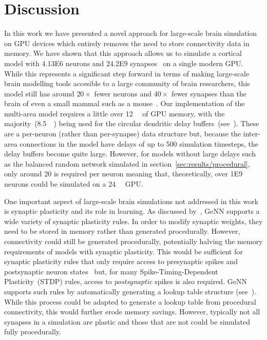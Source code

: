 \documentclass[9pt,a4paper]{amsart}
\begin{document}
\section{Discussion}
In this work we have presented a novel approach for large-scale brain simulation on GPU devices which entirely removes the need to store connectivity data in memory.
We have shown that this approach allows us to simulate a cortical model with \num{4.13E6} neurons and \num{24.2E9} synapses~\citep{Schmidt2018a,Schmidt2018} on a single modern GPU.
While this represents a significant step forward in terms of making large-scale brain modelling tools accesible to a large community of brain researchers, this model still has around $20\times$ fewer neurons and $40\times$ fewer synapses than the brain of even a small mammal such as a mouse~\citep{Herculano-Houzel2010}.
Our implementation of the multi-area model requires a little over \SI{12}{\giga\byte} of GPU memory, with the majority~(\SI{8.5}{\giga\byte}) being used for the circular dendritic delay buffers~(see~\citet{Knight2018}).
These are a per-neuron (rather than per-synapse) data structure but, because the inter-area connections in the model have delays of up to 500 simulation timesteps, the delay buffers become quite large.
However, for models without large delays such as the balanced random network simulated in section~\ref{sec:results/procedural}, only around \SI{20}{\byte} is required per neuron meaning that, theoretically, over \num{1E9} neurons could be simulated on a \SI{24}{\giga\byte} GPU.

One important aspect of large-scale brain simulations not addressed in this work is synaptic plasticity and its role in learning.
As discussed by~\citet{Knight2018}, GeNN supports a wide variety of synaptic plasticity rules.
In order to modify synaptic weights, they need to be stored in memory rather than generated procedurally.
However, connectivity could still be generated procedurally, potentially halving the memory requirements of models with synaptic plasticity.
This would be sufficient for synaptic plasticity rules that only require access to presynaptic spikes and postsynaptic neuron states~\citep{Brader2007,Clopath2010c} but, for many Spike-Timing-Dependent Plasticity~(STDP) rules, access to \emph{postsynaptic} spikes is also required.
GeNN supports such rules by automatically generating a lookup table structure (see~\citet{Knight2018}).
While this process could be adapted to generate a lookup table from procedural connectivity, this would further erode memory savings.
However, typically not all synapses in a simulation are plastic and those that are not could be simulated fully procedurally.
\end{document}

